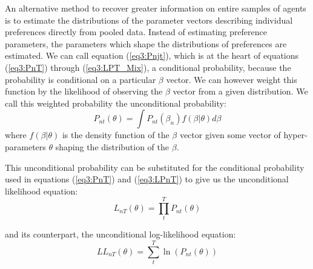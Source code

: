 \documentclass[../main.tex]{subfiles}
\begin{document}
An alternative method to recover greater information on entire samples of agents is to estimate the distributions of the parameter vectors describing individual preferences directly from pooled data.
Instead of estimating preference parameters, the parameters which shape the distributions of preferences are estimated.
We can call equation (\ref{eq3:Pnjt}), which is at the heart of equations (\ref{eq3:PnT}) through (\ref{eq3:LPT_Mix}), a conditional probability, because the probability is conditional on a particular $\beta$ vector.
We can however weight this function by the likelihood of observing the $\beta$ vector from a given distribution.{\footnotemark}
We call this weighted probability the unconditional probability:
\begin{equation}
	\label{eq3:Pnt}
	P_{nt}(\theta) = \int P_{nt}(\beta_n) f(\beta | \theta) d\beta	
\end{equation}
\noindent where $f(\beta|\theta)$ is the density function of the $\beta$ vector given some vector of hyper-parameters $\theta$ shaping the distribution of the $\beta$.

\addtocounter{footnote}{-1}



This unconditional probability can be substituted for the conditional probability used in equations (\ref{eq3:PnT}) and (\ref{eq3:LPnT}) to give us the unconditional likelihood equation:
\begin{equation}
	\label{eq3:LnT}
	L_{nT}(\theta) = \prod_t^T P_{nt}(\theta)
\end{equation}

\noindent and its counterpart, the unconditional log-likelihood equation:
\begin{equation}
	\label{eq3:LLnT}
	\mathit{LL}_{nT}(\theta) = \sum_t^T \ln \left( P_{nt}(\theta) \right)
\end{equation}
\end{document}
